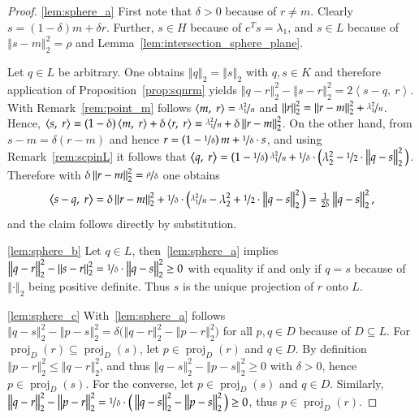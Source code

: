 \documentclass[twoside,11pt]{article}
\DeclareMathOperator{\proj}{proj}
\newcommand{\0}{\mathcal{O}}
\newcommand{\transp}{^T}
\newcommand{\norm}[1]{\left\Vert#1\right\Vert}
\newcommand{\scp}[2]{\left<#1,\ #2\right>}
\begin{document}
\begin{proof}
\ref{lem:sphere_a}
First note that $\delta > 0$ because of $r\neq m$.
Clearly $s = (1 - \delta)m + \delta r$.
Further, $s\in H$ because of $e\transp s = \lambda_1$, and $s\in L$ because of $\norm{s - m}_2^2 = \rho$ and Lemma~\ref{lem:intersection_sphere_plane}.

Let $q\in L$ be arbitrary.
One obtains $\norm{q}_2 = \norm{s}_2$ with $q,s\in K$ and therefore application of Proposition~\ref{prop:sqnrm} yields $\norm{q - r}_2^2 - \norm{s - r}_2^2 = 2\scp{s - q}{r}$.
With Remark~\ref{rem:point_m} follows $\scp{m}{r} = \nicefrac{\lambda_1^2}{n}$ and $\norm{r}_2^2 = \norm{r - m}_2^2 + \nicefrac{\lambda_1^2}{n}$.
Hence, $\scp{s}{r} = (1 - \delta)\scp{m}{r} + \delta\scp{r}{r} = \nicefrac{\lambda_1^2}{n} + \delta\norm{r - m}_2^2$.
On the other hand, from $s - m = \delta(r - m)$ and hence $r = \left(1 - \nicefrac{1}{\delta}\right)m + \nicefrac{1}{\delta}\cdot s$, and using Remark~\ref{rem:scpinL} it follows that $\scp{q}{r} = \left(1 - \nicefrac{1}{\delta}\right)\nicefrac{\lambda_1^2}{n} + \nicefrac{1}{\delta}\cdot\big(\lambda_2^2 - \nicefrac{1}{2}\cdot\norm{q - s}_2^2\big)$.
Therefore with $\delta\norm{r - m}_2^2 = \nicefrac{\rho}{\delta}$ one obtains
\begin{displaymath}
  \scp{s - q}{r}
  = \delta\norm{r - m}_2^2 + \nicefrac{1}{\delta}\cdot\big(\nicefrac{\lambda_1^2}{n} - \lambda_2^2 + \nicefrac{1}{2}\cdot\norm{q - s}_2^2\big)
  = \tfrac{1}{2\delta}\norm{q - s}_2^2\text{,}
\end{displaymath}
and the claim follows directly by substitution.

\ref{lem:sphere_b}
Let $q\in L$, then~\ref{lem:sphere_a} implies $\norm{q - r}_2^2 - \norm{s - r}_2^2 = \nicefrac{1}{\delta}\cdot\norm{q - s}_2^2 \geq 0$ with equality if and only if $q = s$ because of $\norm{\cdot}_2$ being positive definite. Thus $s$ is the unique projection of $r$ onto $L$.

\ref{lem:sphere_c}
With~\ref{lem:sphere_a} follows $\norm{q - s}_2^2 - \norm{p - s}_2^2 = \delta\big(\norm{q - r}_2^2 - \norm{p - r}_2^2\big)$ for all $p,q\in D$ because of $D\subseteq L$.
For $\proj_D(r) \subseteq \proj_D(s)$, let $p\in\proj_D(r)$ and $q\in D$.
By definition $\norm{p - r}_2^2 \leq \norm{q - r}_2^2$, and thus $\norm{q - s}_2^2 - \norm{p - s}_2^2 \geq 0$ with $\delta > 0$, hence $p\in\proj_D(s)$.
For the converse, let $p\in\proj_D(s)$ and $q\in D$.
Similarly, $\norm{q - r}_2^2 - \norm{p - r}_2^2 = \nicefrac{1}{\delta}\cdot\big(\norm{q - s}_2^2 - \norm{p - s}_2^2\big) \geq 0$, thus $p\in\proj_D(r)$.
\end{proof}
\end{document}
